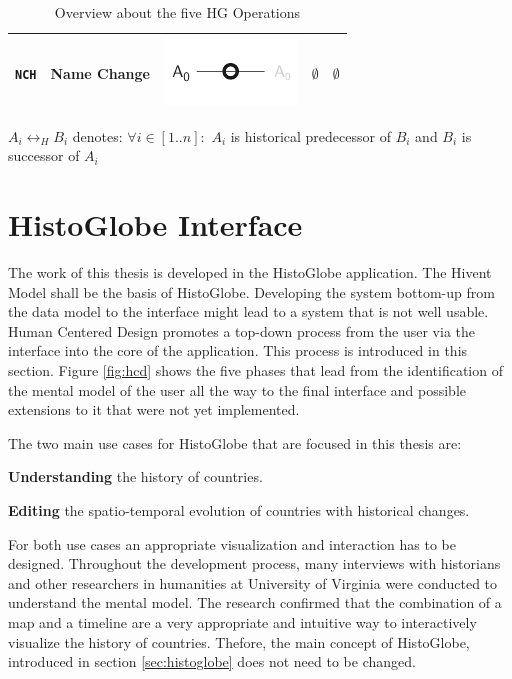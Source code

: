 \begin{table}[H]
\begin{center}
\begin{tabular}{m{0.75cm} m{2.5cm} m{2.5cm} m{2.0cm} m{2.5cm}}
  \midrule
  \texttt{NCH} & Name Change & \raisebox{-0.25\height}
  {\includegraphics{graphics/development/hg_operations/NCH}} &
  $ \emptyset $ &
  $ \emptyset $ \\

  \bottomrule
\end{tabular}
\caption{Overview about the five HG Operations}
\small{$A_i \leftrightarrow_H B_i$ denotes: $\forall i \in [1..n]:$ $A_i$ is historical predecessor of $B_i$ and $B_i$ is successor of $A_i$}
\label{tab:historical_geographic_operations}
\end{center}
\end{table}



\section{HistoGlobe Interface} %
\label{sec:histoglobe_interface}

The work of this thesis is developed in the HistoGlobe application. The Hivent Model shall be the basis of HistoGlobe. Developing the system bottom-up from the data model to the interface might lead to a system that is not well usable. Human Centered Design promotes a top-down process from the user via the interface into the core of the application. This process is introduced in this section. Figure \ref{fig:hcd} shows the five phases that lead from the identification of the mental model of the user all the way to the final interface and possible extensions to it that were not yet implemented.

The two main use cases for HistoGlobe that are focused in this thesis are:
\begin{compactenum}
  \item \textbf{Understanding} the history of countries.
  \item \textbf{Editing} the spatio-temporal evolution of countries with historical changes.
\end{compactenum}

For both use cases an appropriate visualization and interaction has to be designed. Throughout the development process, many interviews with historians and other researchers in humanities at University of Virginia were conducted to understand the mental model. The research confirmed that the combination of a map and a timeline are a very appropriate and intuitive way to interactively visualize the history of countries. Thefore, the main concept of HistoGlobe, introduced in section \ref{sec:histoglobe} does not need to be changed.

